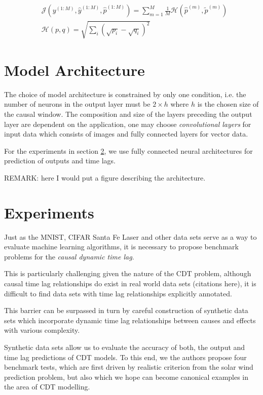 \documentclass[twoside]{article}
\begin{document}
\begin{align}\label{eq:hellinger}
& \mathcal{J}(y^{(1:M)}, \hat{y}^{(1:M)}, \hat{p}^{(1:M)}) = \sum_{m = 1}^{M}{\frac{1}{M} \mathcal{H}(\hat{p}^{(m)}, \widetilde{p}^{(m)})} \\
& \mathcal{H}(p, q) = \sqrt{\sum_{i}{(\sqrt{p_i} -  \sqrt{q_i})^2}}
\end{align}

\section{Model Architecture}

The choice of model architecture is constrained by only one condition, i.e. the number of neurons in the output layer 
must be $2 \times h$ where $h$ is the chosen size of the causal window. The composition and size of the layers preceding
the output layer are dependent on the application, one may choose \emph{convolutional layers} for input data which consists
of images and fully connected layers for vector data.

For the experiments in section \ref{sec:exp}, we use fully connected neural architectures for prediction of outputs and time lags.

REMARK: here I would put a figure describing the architecture.

\section{Experiments}\label{sec:exp}


Just as the MNIST, CIFAR Santa Fe Laser and other data sets serve as a way to evaluate machine learning
algorithms, it is necessary to propose benchmark problems for the \emph{causal dynamic time lag}.

This is particularly challenging given the nature of the CDT problem, although causal time lag
relationships do exist in real world data sets (citations here), it is difficult to find data sets
with time lag relationships explicitly annotated.

This barrier can be surpassed in turn by careful construction of synthetic data sets which incorporate dynamic time lag
relationships between causes and effects with various complexity.

Synthetic data sets allow us to evaluate the accuracy of both, the output and time lag predictions of CDT models. 
To this end, we the authors propose four benchmark tests, which are first driven by realistic criterion from the 
solar wind prediction problem, but also which we hope can become canonical examples in the area of CDT modelling.
\end{document}

